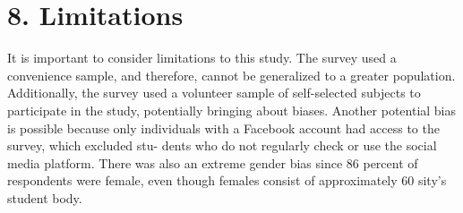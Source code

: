 \documentclass[11pt]{article} %
\begin{document}
\section{8. Limitations }

It is important to consider limitations to this study. The survey used a convenience sample, and 
therefore, cannot be generalized to a greater population. Additionally, the survey used a volunteer sample of 
self-selected subjects to participate in the study, potentially bringing about biases. Another potential bias is 
possible because only individuals with a Facebook account had access to the survey, which excluded stu-
dents who do not regularly check or use the social media platform. There was also an extreme gender bias 
since 86 percent of respondents were female, even though females consist of approximately 60%
sity’s student body. 
\end{document}
